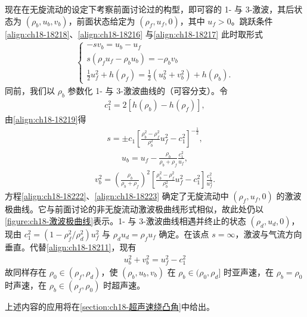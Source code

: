\documentclass[../../main.tex]{subfiles}
\begin{document}
现在在无旋流动的设定下考察前面讨论过的构型，即可容的 1- 与 3-激波，其后状态为 $(\rho_b,u_b,v_b)$，前面状态给定为 $(\rho_f,u_f,0)$，其中 $u_f>0$。跳跃条件\eqref{align:ch18-18218}、\eqref{align:ch18-18216} 与\eqref{align:ch18-18217} 此时取形式
\begin{align}
\begin{cases}
-sv_b=u_b-u_f\\
s(\rho_fu_f-\rho_bu_b)=-\rho_bv_b\\
\frac12 u_f^2+h(\rho_f)=\frac12(u_b^2+v_b^2)+h(\rho_b).
\end{cases}
\label{align:ch18-18219}
\end{align}
同前，我们以 $\rho_b$ 参数化 1- 与 3-激波曲线的（可容分支）。令
\begin{align}
c_1^2=2[h(\rho_b)-h(\rho_f)],
\label{align:ch18-18220}
\end{align}
由\eqref{align:ch18-18219}得
\begin{align}
s=\pm c_1\left[\frac{\rho_b^2-\rho_f^2}{\rho_b^2}u_f^2-c_1^2\right]^{-\frac12},
\label{align:ch18-18221}
\end{align}
\begin{align}
u_b=u_f-\frac{\rho_b}{\rho_b+\rho_f}\frac{c_1^2}{u_f},
\label{align:ch18-18222}
\end{align}
\begin{align}
v_b^2=\left(\frac{\rho_b}{\rho_b+\rho_f}\right)^2\left[\frac{\rho_b^2-\rho_f^2}{\rho_b^2}u_f^2-c_1^2\right]\frac{c_1^2}{u_f^2}.
\label{align:ch18-18223}
\end{align}
方程\eqref{align:ch18-18222}、\eqref{align:ch18-18223} 确定了无旋流动中 $(\rho_f,u_f,0)$ 的激波极曲线。它与前面讨论的非无旋流动激波极曲线形式相似，故此处仍以\cref{figure:ch18-激波极曲线}表示。1- 与 3-激波曲线相遇并终止的状态 $(\rho_d,u_d,0)$，现由 $c_1^2=(1-\rho_f^2/\rho_d^2)u_f^2$ 与 $\rho_du_d=\rho_fu_f$ 确定。在该点 $s=\infty$，激波与气流方向垂直。代替\eqref{align:ch18-18211}，现有
\begin{align}
u_b^2+v_b^2=u_f^2-c_1^2
\label{align:ch18-18224}
\end{align}
故同样存在 $\rho_0\in(\rho_f,\rho_d)$，使 $(\rho_b,u_b,v_b)$ 在 $\rho_b\in(\rho_0,\rho_d]$ 时亚声速，在 $\rho_b=\rho_0$ 时声速，在 $\rho_b\in(\rho_f,\rho_0)$ 时超声速。

上述内容的应用将在\cref{section:ch18-超声速绕凸角}中给出。
\end{document}
